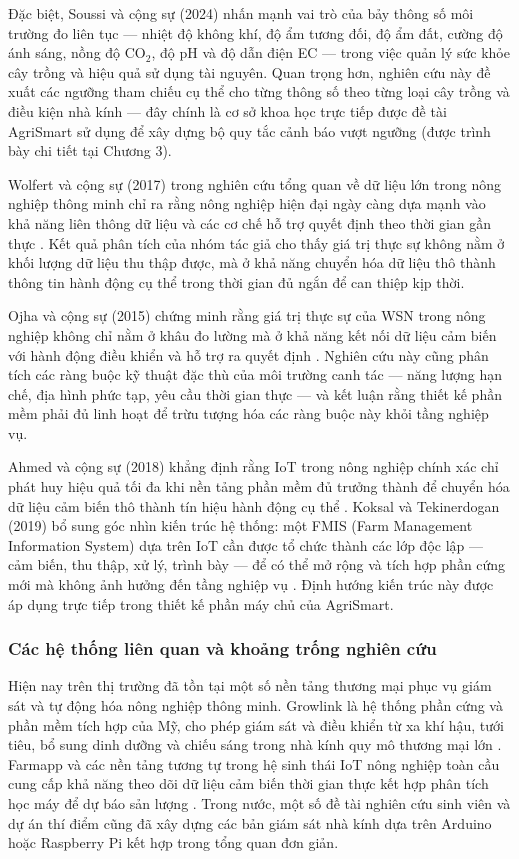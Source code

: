 \documentclass[13pt,a4paper]{extarticle}
\numberwithin{figure}{section}
\numberwithin{table}{section}
\begin{document}
	Đặc biệt, Soussi và cộng sự (2024) nhấn mạnh vai trò của bảy thông số môi trường đo liên tục --- nhiệt độ không khí, độ ẩm tương đối, độ ẩm đất, cường độ ánh sáng, nồng độ CO$_2$, độ pH và độ dẫn điện EC --- trong việc quản lý sức khỏe cây trồng và hiệu quả sử dụng tài nguyên. Quan trọng hơn, nghiên cứu này đề xuất các ngưỡng tham chiếu cụ thể cho từng thông số theo từng loại cây trồng và điều kiện nhà kính --- đây chính là cơ sở khoa học trực tiếp được đề tài AgriSmart sử dụng để xây dựng bộ quy tắc cảnh báo vượt ngưỡng (được trình bày chi tiết tại Chương 3).
	
	Wolfert và cộng sự (2017) trong nghiên cứu tổng quan về dữ liệu lớn trong nông nghiệp thông minh chỉ ra rằng nông nghiệp hiện đại ngày càng dựa mạnh vào khả năng liên thông dữ liệu và các cơ chế hỗ trợ quyết định theo thời gian gần thực \cite{wolfert2017}. Kết quả phân tích của nhóm tác giả cho thấy giá trị thực sự không nằm ở khối lượng dữ liệu thu thập được, mà ở khả năng chuyển hóa dữ liệu thô thành thông tin hành động cụ thể trong thời gian đủ ngắn để can thiệp kịp thời.
	
	Ojha và cộng sự (2015) chứng minh rằng giá trị thực sự của WSN trong nông nghiệp không chỉ nằm ở khâu đo lường mà ở khả năng kết nối dữ liệu cảm biến với hành động điều khiển và hỗ trợ ra quyết định \cite{ojha2015}. Nghiên cứu này cũng phân tích các ràng buộc kỹ thuật đặc thù của môi trường canh tác --- năng lượng hạn chế, địa hình phức tạp, yêu cầu thời gian thực --- và kết luận rằng thiết kế phần mềm phải đủ linh hoạt để trừu tượng hóa các ràng buộc này khỏi tầng nghiệp vụ.
	
	Ahmed và cộng sự (2018) khẳng định rằng IoT trong nông nghiệp chính xác chỉ phát huy hiệu quả tối đa khi nền tảng phần mềm đủ trưởng thành để chuyển hóa dữ liệu cảm biến thô thành tín hiệu hành động cụ thể \cite{ahmed2018}. Koksal và Tekinerdogan (2019) bổ sung góc nhìn kiến trúc hệ thống: một FMIS (Farm Management Information System) dựa trên IoT cần được tổ chức thành các lớp độc lập --- cảm biến, thu thập, xử lý, trình bày --- để có thể mở rộng và tích hợp phần cứng mới mà không ảnh hưởng đến tầng nghiệp vụ \cite{koksal2019}. Định hướng kiến trúc này được áp dụng trực tiếp trong thiết kế phần máy chủ của AgriSmart.
	
	\subsubsection{Các hệ thống liên quan và khoảng trống nghiên cứu}
	
	Hiện nay trên thị trường đã tồn tại một số nền tảng thương mại phục vụ giám sát và tự động hóa nông nghiệp thông minh. Growlink là hệ thống phần cứng và phần mềm tích hợp của Mỹ, cho phép giám sát và điều khiển từ xa khí hậu, tưới tiêu, bổ sung dinh dưỡng và chiếu sáng trong nhà kính quy mô thương mại lớn \cite{growlink2024}. Farmapp và các nền tảng tương tự trong hệ sinh thái IoT nông nghiệp toàn cầu cung cấp khả năng theo dõi dữ liệu cảm biến thời gian thực kết hợp phân tích học máy để dự báo sản lượng \cite{farmapp2024}. Trong nước, một số đề tài nghiên cứu sinh viên và dự án thí điểm cũng đã xây dựng các bản giám sát nhà kính dựa trên Arduino hoặc Raspberry Pi kết hợp trong tổng quan đơn giản.
	
\end{document}
